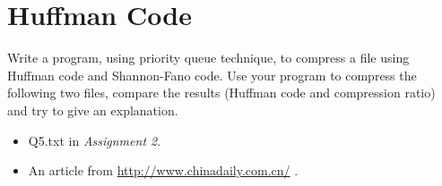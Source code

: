 \documentclass[a4paper,10pt]{article}
\begin{document}
\section{Huffman Code}
Write a program, using priority queue technique, to compress a file using Huffman code and Shannon-Fano code.  Use your program to compress the following two files, compare the results (Huffman code and compression ratio) and try to give an explanation.
\begin{itemize}
	\item Q5.txt in \emph{Assignment 2}.
	\item An article from \url{http://www.chinadaily.com.cn/} .
\end{itemize}
\end{document}
